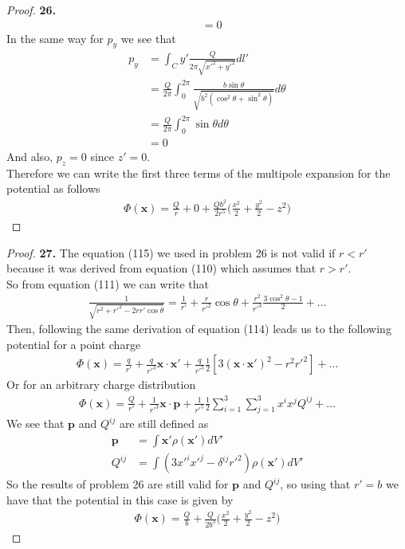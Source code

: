 \documentclass[11pt]{article}
\theoremstyle{definition}
\begin{document}
\begin{proof}{\textbf{26.}}
\begin{align*}
    &= 0
\end{align*}
In the same way for $p_y$ we see that
\begin{align*}
    p_y &= \int_C y'\frac{Q}{2\pi\sqrt{x'^2 + y'^2}}dl'\\
    &= \frac{Q}{2\pi}\int_0^{2\pi}
    \frac{b\sin\theta}{\sqrt{b^2(\cos^2\theta + \sin^2\theta)}}d\theta\\
    &= \frac{Q}{2\pi}\int_0^{2\pi} \sin\theta d\theta\\
    &= 0
\end{align*}
And also, $p_z = 0$ since $z' = 0$.
\\
Therefore we can write the first three terms of the multipole expansion for the
potential as follows
\begin{align*}
    \Phi(\bm{x}) = \frac{Q}{r} + 0 + \frac{Qb^2}{2r^5}
    \bigg(\frac{x^2}{2} + \frac{y^2}{2} - z^2\bigg)
\end{align*}
\end{proof}

\cleardoublepage
\begin{proof}{\textbf{27.}}
The equation (115) we used in problem 26 is not valid if $r < r'$ because it 
was derived from equation (110) which assumes that $r > r'$.
\\
So from equation (111) we can write that
\begin{align*}
    \frac{1}{\sqrt{r^2 + r'^2 - 2rr'\cos\theta}}
    = \frac{1}{r'} + \frac{r}{r'^2}\cos\theta
    + \frac{r^2}{r'^3}\frac{3\cos^2\theta - 1}{2} + ...
\end{align*}
Then, following the same derivation of equation (114) leads us to the following
potential for a point charge
\begin{align*}
    \Phi(\bm{x})
    = \frac{q}{r'} + \frac{q}{r'^3}\bm{x}\cdot\bm{x}'
    + \frac{q}{r'^5}\frac{1}{2}[3(\bm{x}\cdot\bm{x}')^2 - r^2r'^2] + ...
\end{align*}
Or for an arbitrary charge distribution
\begin{align*}
    \Phi(\bm{x})
    = \frac{Q}{r'} + \frac{1}{r'^3}\bm{x}\cdot\bm{p}
    + \frac{1}{r'^5}\frac{1}{2}\sum_{i=1}^3\sum_{j=1}^3 x^ix^jQ^{ij} + ...
\end{align*}
We see that $\bm{p}$ and $Q^{ij}$ are still defined as 
\begin{align*}
    \bm{p} &= \int \bm{x}' \rho(\bm{x}') dV'\\
    Q^{ij} &= \int (3x'^ix'^j - \delta^{ij}r'^2)\rho(\bm{x}')dV'
\end{align*}
So the results of problem 26 are still valid for $\bm{p}$ and $Q^{ij}$, so
using that $r' = b$ we have that the potential in this case is given by
\begin{align*}
    \Phi(\bm{x}) = \frac{Q}{b}
    + \frac{Q}{2b^3}\bigg(\frac{x^2}{2} + \frac{y^2}{2} - z^2\bigg)
\end{align*}



\end{proof}
\end{document}
